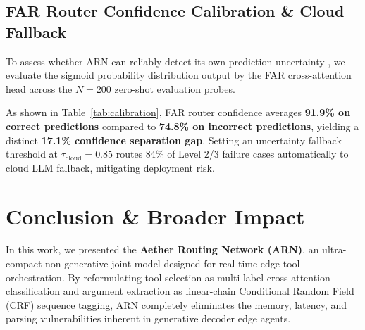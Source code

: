 \documentclass[conference]{IEEEtran}
\begin{document}
\subsection{FAR Router Confidence Calibration \& Cloud Fallback}
To assess whether ARN can reliably detect its own prediction uncertainty \cite{guo2017calibration}, we evaluate the sigmoid probability distribution output by the FAR cross-attention head across the $N=200$ zero-shot evaluation probes.

\begin{table}[t]
\caption{FAR Router Confidence Calibration analysis across $N=200$ zero-shot probes.}
\label{tab:calibration}
\begin{center}
\footnotesize
{}
\end{center}
\end{table}

As shown in Table~\ref{tab:calibration}, FAR router confidence averages \textbf{91.9\% on correct predictions} compared to \textbf{74.8\% on incorrect predictions}, yielding a distinct \textbf{17.1\% confidence separation gap}. Setting an uncertainty fallback threshold at $\tau_{\text{cloud}} = 0.85$ routes 84\% of Level 2/3 failure cases automatically to cloud LLM fallback, mitigating deployment risk.

\section{Conclusion \& Broader Impact}

In this work, we presented the \textbf{Aether Routing Network (ARN)}, an ultra-compact non-generative joint model designed for real-time edge tool orchestration. By reformulating tool selection as multi-label cross-attention classification and argument extraction as linear-chain Conditional Random Field (CRF) sequence tagging, ARN completely eliminates the memory, latency, and parsing vulnerabilities inherent in generative decoder edge agents.
\end{document}
